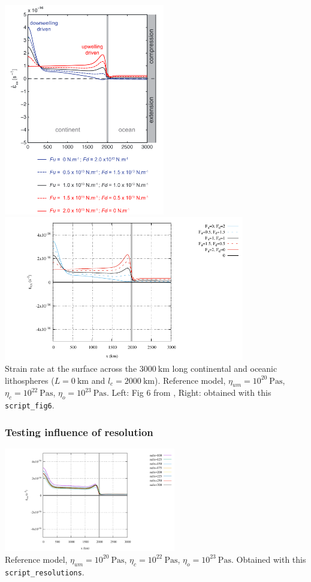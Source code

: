 \begin{center}
\includegraphics[width=7cm]{python_codes/fieldstone_143/images/fig6}
\includegraphics[width=10.5cm]{python_codes/fieldstone_143/results/fig6/fig6a}\\
{\captionfont 
Strain rate at the surface across the $3000~\si{\km}$ long continental and 
oceanic lithospheres ($L=0~\si{\km}$ and $l_ c=2000~\si{\km}$).
Reference model, $\eta_{um}=10^{20}~\si{\pascal\second}$, 
$\eta_c=10^{22}~\si{\pascal\second}$, $\eta_o=10^{23}~\si{\pascal\second}$. 
Left: Fig 6 from \cite{yahb13}, Right: obtained with this  {\tt script\_fig6}.}
\end{center}


\subsubsection*{Testing influence of resolution}

\begin{center}
\includegraphics[width=7.5cm]{python_codes/fieldstone_143/results/resolutions/fig_resolutions}\\
{\captionfont 
Reference model, $\eta_{um}=10^{20}~\si{\pascal\second}$, 
$\eta_c=10^{22}~\si{\pascal\second}$, $\eta_o=10^{23}~\si{\pascal\second}$. 
Obtained with this  {\tt script\_resolutions}.}
\end{center}

